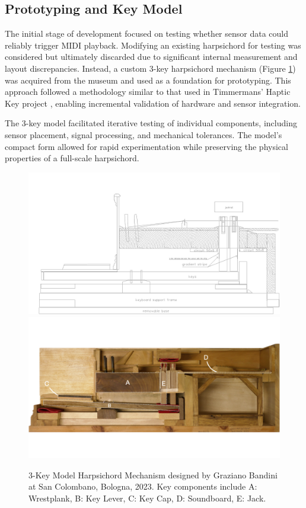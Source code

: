 \subsection{Prototyping and Key Model}

The initial stage of development focused on testing whether sensor data could reliably trigger MIDI playback. Modifying an existing harpsichord for testing was considered but ultimately discarded due to significant internal measurement and layout discrepancies. Instead, a custom 3-key harpsichord mechanism (Figure \ref{fig:3key}) was acquired from the museum and used as a foundation for prototyping. This approach followed a methodology similar to that used in Timmermans' Haptic Key project \cite{Timmermans2020}, enabling incremental validation of hardware and sensor integration.

The 3-key model facilitated iterative testing of individual components, including sensor placement, signal processing, and mechanical tolerances. The model’s compact form allowed for rapid experimentation while preserving the physical properties of a full-scale harpsichord.

\begin{figure}
    \centering
    \includegraphics[width=\linewidth]{src/images/CrossSectionSensorPlacement.jpg}
    \\
    \includegraphics[width=\linewidth]{src/images/3-key-side-labelled.png}
    \caption{3-Key Model Harpsichord Mechanism designed by Graziano Bandini at San Colombano, Bologna, 2023. Key components include A: Wrestplank, B: Key Lever, C: Key Cap, D: Soundboard, E: Jack.}
    \label{fig:3key}
\end{figure}

